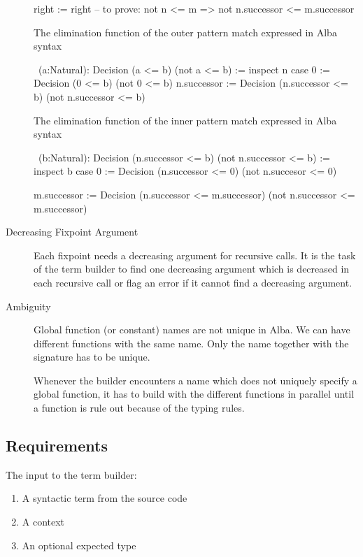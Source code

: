 \begin{description}
\begin{alba}
                  right := right
                    -- to prove: not n <= m => not n.successor <= m.successor
  \end{alba}
  The elimination function of the outer pattern match expressed in Alba syntax
  \begin{alba}
    \ (a:Natural): Decision (a <= b) (not a <= b) :=
      inspect n case
        0 :=
          Decision (0 <= b) (not 0 <= b)
        n.successor :=
          Decision (n.successor <= b) (not n.successor <= b)
  \end{alba}
  The elimination function of the inner pattern match expressed in Alba syntax
  \begin{alba}
    \ (b:Natural): Decision (n.successor <= b) (not n.successor <= b) :=
      inspect b case
        0 :=
          Decision (n.successor <= 0) (not n.succesor <= 0)

        m.successor :=
          Decision (n.successor <= m.successor)
                   (not n.successor <= m.successor)
  \end{alba}




\item[Decreasing Fixpoint Argument]
  Each fixpoint needs a decreasing argument for recursive calls. It is the
  task of the term builder to find one decreasing argument which is decreased
  in each recursive call or flag an error if it cannot find a decreasing
  argument.



\item[Ambiguity]
  Global function (or constant) names are not unique in Alba. We can have
  different functions with the same name. Only the name together with the
  signature has to be unique.

  Whenever the builder encounters a name which does not uniquely specify a
  global function, it has to build with the different functions in parallel
  until a function is rule out because of the typing rules.

\end{description}





\subsection{Requirements}

The input to the term builder:
%
\begin{enumerate}

\item A syntactic term from the source code

\item A context

\item An optional expected type
\end{enumerate}

